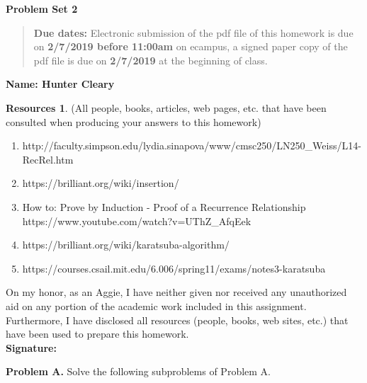 \documentclass{article}
\theoremstyle{definition}
\newtheorem*{resources}{Resources}
\newcommand{\name}[1]{\noindent\textbf{Name: #1}}
\newcommand{\honor}{\noindent On my honor, as an Aggie, I have neither
  given nor received any unauthorized aid on any portion of the
  academic work included in this assignment. Furthermore, I have
  disclosed all resources (people, books, web sites, etc.) that have
  been used to prepare this homework. \\[1ex]
 \textbf{Signature:} \underline{\hspace*{5cm}} }
\newcommand{\problemset}[1]{\begin{center}\textbf{Problem Set
      #1}\end{center}}
\newcommand{\duedate}[2]{\begin{quote}\textbf{Due dates:} Electronic
    submission of the pdf file of this homework is due on
    \textbf{#1} on ecampus, a signed paper copy of the pdf file is due
    on \textbf{#2} at the beginning of class. \end{quote} }
\begin{document}
\problemset{2}
\duedate{2/7/2019 before 11:00am}{2/7/2019}
\name{Hunter Cleary}
\begin{resources} (All people, books, articles, web pages, etc. that
  have been consulted when producing your answers to this homework)
  \begin{enumerate}
      \item http://faculty.simpson.edu/lydia.sinapova/www/cmsc250/LN250\_Weiss/L14-RecRel.htm
      \item https://brilliant.org/wiki/insertion/
      \item How to: Prove by Induction - Proof of a Recurrence Relationship
      \\https://www.youtube.com/watch?v=UThZ\_AfqEek
      \item https://brilliant.org/wiki/karatsuba-algorithm/
      \item https://courses.csail.mit.edu/6.006/spring11/exams/notes3-karatsuba

  \end{enumerate}
\end{resources}
\honor

\newpage

\medskip
\noindent\textbf{Problem A.} Solve the following subproblems of
Problem A. 
\end{document}
